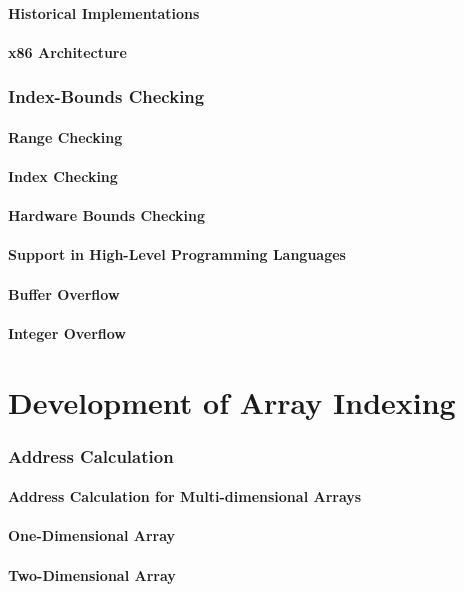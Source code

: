 \documentclass[12pt, oneside]{book}
\begin{document}
\subsubsection{Historical Implementations}
\subsubsection{x86 Architecture}
\subsection{Index-Bounds Checking}
\subsubsection{Range Checking}
\subsubsection{Index Checking}
\subsubsection{Hardware Bounds Checking}
\subsubsection{Support in High-Level Programming Languages}
\subsubsection{Buffer Overflow}
\subsubsection{Integer Overflow}
\chapter{Development of Array Indexing}
\subsection{Address Calculation}
\subsubsection{Address Calculation for Multi-dimensional Arrays}
\subsubsection{One-Dimensional Array}
\subsubsection{Two-Dimensional Array}
\end{document}

